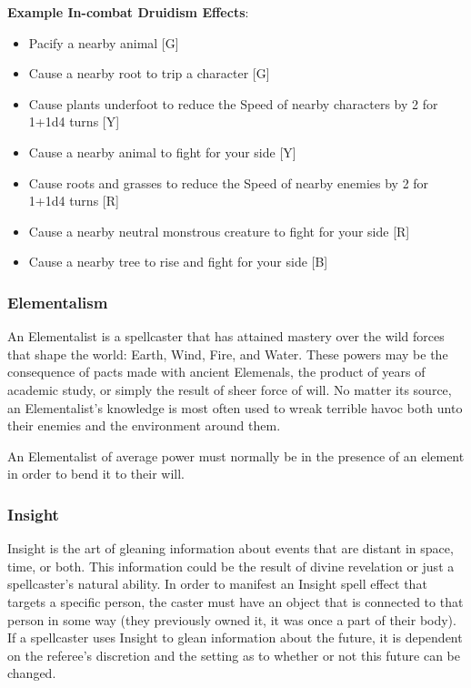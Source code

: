 \documentclass[oneside]{book}
\begin{document}
\begin{multicols}{2}
\textbf{Example In-combat Druidism Effects}: 
	\begin{itemize}
		\setlength{\itemsep}{0cm}%
  		\setlength{\parskip}{0cm}%
		\item{ \small Pacify a nearby animal [G]}
		\item{ \small Cause a nearby root to trip a character [G]}
		\item{ \small Cause plants underfoot to reduce the Speed of nearby characters by 2 for 1+1d4 turns [Y]}
		\item{ \small Cause a nearby animal to fight for your side [Y]}
		\item{ \small Cause roots and grasses to reduce the Speed of nearby enemies by 2 for 1+1d4 turns [R]}
		\item{ \small Cause a nearby neutral monstrous creature to fight for your side [R]}
		\item{ \small Cause a nearby tree to rise and fight for your side [B]}
	\end{itemize}

\subsubsection{Elementalism}
An Elementalist is a spellcaster that has attained mastery over the  wild forces that shape the world: Earth, Wind, Fire, and Water. These powers may be the consequence of pacts made with ancient Elemenals, the product of years of academic study, or simply the result of sheer force of will. No matter its source, an Elementalist's knowledge is most often used to wreak terrible havoc both unto their enemies and the environment around them. 

An Elementalist of average power must normally be in the presence of an element in order to bend it to their will.    

\subsubsection{Insight}
Insight is the art of gleaning information about events that are distant in space, time, or both. This information could be the result of divine revelation or just a spellcaster's natural ability. In order to manifest an Insight spell effect that targets a specific person, the caster must have an object that is connected to that person in some way (they previously owned it, it was once a part of their body). If a spellcaster uses Insight to glean information about the future, it is dependent on the referee's discretion and the setting as to whether or not this future can be changed.


\end{multicols}
\end{document}
